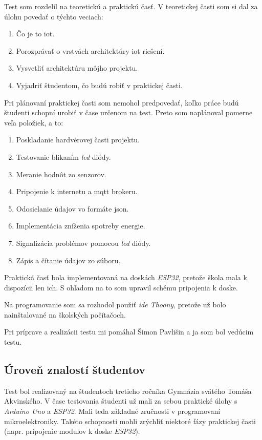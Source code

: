 Test som rozdelil na teoretickú a praktickú časť. V teoretickej časti som si dal za úlohu povedať o týchto veciach:
\begin{enumerate}
    \item Čo je to \gls{iot}.
    \item Porozprávať o vrstvách architektúry \gls{iot} riešení.
    \item Vysvetliť architektúru môjho projektu.
    \item Vyjadriť študentom, čo budú robiť v praktickej časti.
\end{enumerate}

Pri plánovaní praktickej časti som nemohol predpovedať, koľko práce budú študenti schopní urobiť v čase určenom na test. Preto som naplánoval pomerne veľa položiek, a to:

\begin{enumerate}
    \item Poskladanie hardvérovej časti projektu.
    \item Testovanie blikaním \textit{\gls{led}} diódy.
    \item Meranie hodnôt zo senzorov.
    \item Pripojenie k internetu a \gls{mqtt} brokeru.
    \item Odosielanie údajov vo formáte \gls{json}.
    \item Implementácia zníženia spotreby energie.
    \item Signalizácia problémov pomocou \textit{\gls{led}} diódy.
    \item Zápis a čítanie údajov zo súboru.
\end{enumerate}

Praktická časť bola implementovaná na doskách \textit{ESP32}, pretože škola mala k dispozícii len ich. S ohľadom na to som upravil schému pripojenia k doske. 

Na programovanie som sa rozhodol použiť \textit{\gls{ide} Thoony}, pretože už bolo nainštalované na školských počítačoch.

Pri príprave a realizácii testu mi pomáhal Šimon Pavlišin a ja som bol vedúcim testu.

\subsection{Úroveň znalostí študentov}

Test bol realizovaný na študentoch tretieho ročníka Gymnázia svätého Tomáša Akvinského. V čase testovania študenti už mali za sebou praktické úlohy s \textit{Arduino Uno} a \textit{ESP32}. Mali teda základné zručnosti v programovaní mikroelektroniky. Takéto schopnosti mohli zrýchliť niektoré fázy praktickej časti (napr. pripojenie modulov k doske \textit{ESP32}).

